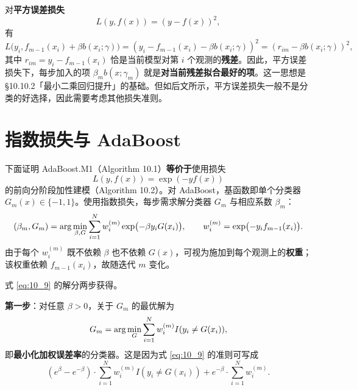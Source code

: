 对\textbf{平方误差损失}
\begin{equation}\label{eq:10_6}
    L(y, f(x)) = (y - f(x))^2,
\end{equation}
有
\begin{equation}\label{eq:10_7}
    L\bigl(y_i, f_{m-1}(x_i) + \beta b(x_i; \gamma)\bigr) = (y_i - f_{m-1}(x_i) - \beta b(x_i; \gamma))^2 = (r_{im} - \beta b(x_i; \gamma))^2,
\end{equation}
其中 $r_{im} = y_i - f_{m-1}(x_i)$ 恰是当前模型对第 $i$ 个观测的\textbf{残差}。因此，平方误差损失下，每步加入的项 $\beta_m b(x; \gamma_m)$ 就是\textbf{对当前残差拟合最好的项}。这一思想是 §10.10.2「最小二乘回归提升」的基础。但如后文所示，平方误差损失一般不是分类的好选择，因此需要考虑其他损失准则。

\section{指数损失与 AdaBoost}

下面证明 AdaBoost.M1（Algorithm 10.1）\textbf{等价于}使用损失
\begin{equation}\label{eq:10_8}
    L(y, f(x)) = \exp(-y f(x))
\end{equation}
的前向分阶段加性建模（Algorithm 10.2）。对 AdaBoost，基函数即单个分类器 $G_m(x) \in \{-1, 1\}$。使用指数损失，每步需求解分类器 $G_m$ 与相应系数 $\beta_m$：
\begin{equation}\label{eq:10_9}
    (\beta_m, G_m) = \arg\min_{\beta, G} \sum_{i=1}^{N} w_i^{(m)} \exp\bigl(-\beta y_i G(x_i)\bigr), \qquad w_i^{(m)} = \exp\bigl(-y_i f_{m-1}(x_i)\bigr).
\end{equation}
由于每个 $w_i^{(m)}$ 既不依赖 $\beta$ 也不依赖 $G(x)$，可视为施加到每个观测上的\textbf{权重}；该权重依赖 $f_{m-1}(x_i)$，故随迭代 $m$ 变化。

式 \eqref{eq:10_9} 的解分两步获得。

\textbf{第一步}：对任意 $\beta > 0$，关于 $G_m$ 的最优解为
\begin{equation}\label{eq:10_10}
    G_m = \arg\min_{G} \sum_{i=1}^{N} w_i^{(m)} I(y_i \neq G(x_i)),
\end{equation}
即\textbf{最小化加权误差率}的分类器。这是因为式 \eqref{eq:10_9} 的准则可写成
\begin{equation}\label{eq:10_11}
    (e^{\beta} - e^{-\beta}) \cdot \sum_{i=1}^{N} w_i^{(m)} I(y_i \neq G(x_i)) + e^{-\beta} \cdot \sum_{i=1}^{N} w_i^{(m)}.
\end{equation}

